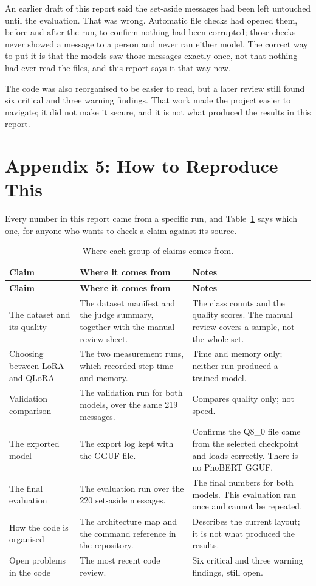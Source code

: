 An earlier draft of this report said the set-aside messages had been left untouched until the evaluation. That was wrong. Automatic file checks had opened them, before and after the run, to confirm nothing had been corrupted; those checks never showed a message to a person and never ran either model. The correct way to put it is that the models saw those messages exactly once, not that nothing had ever read the files, and this report says it that way now.

The code was also reorganised to be easier to read, but a later review still found six critical and three warning findings. That work made the project easier to navigate; it did not make it secure, and it is not what produced the results in this report.

\section*{Appendix 5: How to Reproduce This}

Every number in this report came from a specific run, and Table~\ref{tab:repro-evidence-map} says which one, for anyone who wants to check a claim against its source.

\small
\begin{longtable}{p{3.0cm}p{7.7cm}p{3.2cm}}
\caption{Where each group of claims comes from.}\label{tab:repro-evidence-map}\\
\toprule
\textbf{Claim} & \textbf{Where it comes from} & \textbf{Notes} \\
\midrule
\endfirsthead
\toprule
\textbf{Claim} & \textbf{Where it comes from} & \textbf{Notes} \\
\midrule
\endhead
The dataset and its quality & The dataset manifest and the judge summary, together with the manual review sheet. & The class counts and the quality scores. The manual review covers a sample, not the whole set. \\
\addlinespace
Choosing between LoRA and QLoRA & The two measurement runs, which recorded step time and memory. & Time and memory only; neither run produced a trained model. \\
\addlinespace
Validation comparison & The validation run for both models, over the same 219 messages. & Compares quality only; not speed. \\
\addlinespace
The exported model & The export log kept with the GGUF file. & Confirms the Q8\_0 file came from the selected checkpoint and loads correctly. There is no PhoBERT GGUF. \\
\addlinespace
The final evaluation & The evaluation run over the 220 set-aside messages. & The final numbers for both models. This evaluation ran once and cannot be repeated. \\
\addlinespace
How the code is organised & The architecture map and the command reference in the repository. & Describes the current layout; it is not what produced the results. \\
\addlinespace
Open problems in the code & The most recent code review. & Six critical and three warning findings, still open. \\
\bottomrule
\end{longtable}
\normalsize
